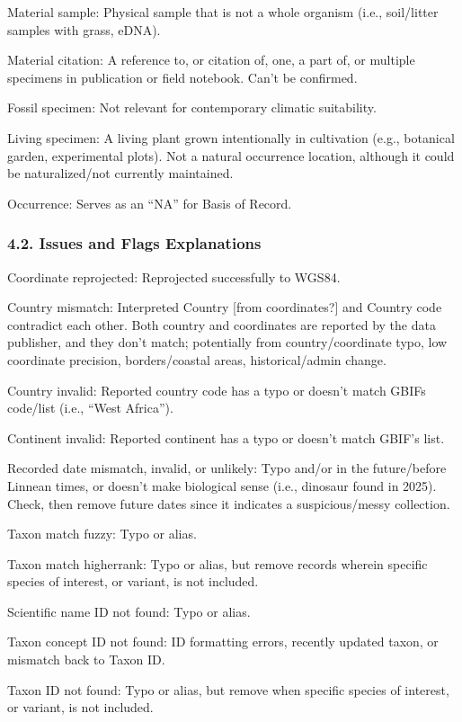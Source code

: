 \documentclass[
]{article}
\begin{document}
Material sample: Physical sample that is not a whole organism (i.e.,
soil/litter samples with grass, eDNA).

Material citation: A reference to, or citation of, one, a part of, or
multiple specimens in publication or field notebook. Can't be confirmed.

Fossil specimen: Not relevant for contemporary climatic suitability.

Living specimen: A living plant grown intentionally in cultivation
(e.g., botanical garden, experimental plots). Not a natural occurrence
location, although it could be naturalized/not currently maintained.

Occurrence: Serves as an ``NA'' for Basis of Record.

\subsubsection{4.2. Issues and Flags
Explanations}\label{issues-and-flags-explanations}

Coordinate reprojected: Reprojected successfully to WGS84.

Country mismatch: Interpreted Country {[}from coordinates?{]} and
Country code contradict each other. Both country and coordinates are
reported by the data publisher, and they don't match; potentially from
country/coordinate typo, low coordinate precision, borders/coastal
areas, historical/admin change.

Country invalid: Reported country code has a typo or doesn't match GBIFs
code/list (i.e., ``West Africa'').

Continent invalid: Reported continent has a typo or doesn't match GBIF's
list.

Recorded date mismatch, invalid, or unlikely: Typo and/or in the
future/before Linnean times, or doesn't make biological sense (i.e.,
dinosaur found in 2025). Check, then remove future dates since it
indicates a suspicious/messy collection.

Taxon match fuzzy: Typo or alias.

Taxon match higherrank: Typo or alias, but remove records wherein
specific species of interest, or variant, is not included.

Scientific name ID not found: Typo or alias.

Taxon concept ID not found: ID formatting errors, recently updated
taxon, or mismatch back to Taxon ID.

Taxon ID not found: Typo or alias, but remove when specific species of
interest, or variant, is not included.
\end{document}

